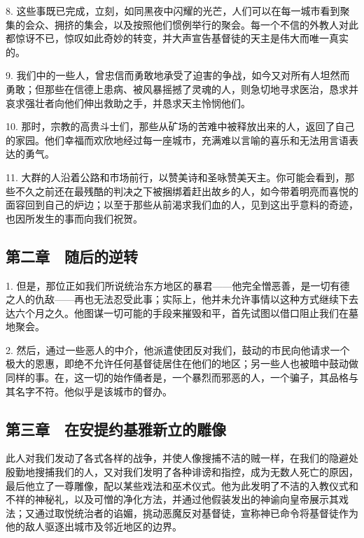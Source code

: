 8. 这些事既已完成，立刻，如同黑夜中闪耀的光芒，人们可以在每一城市看到聚集的会众、拥挤的集会，以及按照他们惯例举行的聚会。每一个不信的外教人对此都惊讶不已，惊叹如此奇妙的转变，并大声宣告基督徒的天主是伟大而唯一真实的。\par

9. 我们中的一些人，曾忠信而勇敢地承受了迫害的争战，如今又对所有人坦然而勇敢；但那些在信德上患病、被风暴摇撼了灵魂的人，则急切地寻求医治，恳求并哀求强壮者向他们伸出救助之手，并恳求天主怜悯他们。\par

10. 那时，宗教的高贵斗士们，那些从矿场的苦难中被释放出来的人，返回了自己的家园。他们幸福而欢欣地经过每一座城市，充满难以言喻的喜乐和无法用言语表达的勇气。\par

11. 大群的人沿着公路和市场前行，以赞美诗和圣咏赞美天主。你可能会看到，那些不久之前还在最残酷的判决之下被捆绑着赶出故乡的人，如今带着明亮而喜悦的面容回到自己的炉边；以至于那些从前渴求我们血的人，见到这出乎意料的奇迹，也因所发生的事而向我们祝贺。\par


\subsection{第二章　随后的逆转}

1. 但是，那位正如我们所说统治东方地区的暴君——他完全憎恶善，是一切有德之人的仇敌——再也无法忍受此事；实际上，他并未允许事情以这种方式继续下去达六个月之久。他图谋一切可能的手段来摧毁和平，首先试图以借口阻止我们在墓地聚会。\par

2. 然后，通过一些恶人的中介，他派遣使团反对我们，鼓动的市民向他请求一个极大的恩惠，即绝不允许任何基督徒居住在他们的地区；另一些人也被暗中鼓动做同样的事。在，这一切的始作俑者是，一个暴烈而邪恶的人，一个骗子，其品格与其名字不符。他似乎是该城市的督办。\par


\subsection{第三章　在安提约基雅新立的雕像}

此人对我们发动了各式各样的战争，并使人像搜捕不洁的贼一样，在我们的隐避处殷勤地搜捕我们的人，又对我们发明了各种诽谤和指控，成为无数人死亡的原因，最后他立了一尊雕像，配以某些戏法和巫术仪式。他为此发明了不洁的入教仪式和不祥的神秘礼，以及可憎的净化方法，并通过他假装发出的神谕向皇帝展示其戏法；又通过取悦统治者的谄媚，挑动恶魔反对基督徒，宣称神已命令将基督徒作为他的敌人驱逐出城市及邻近地区的边界。\par

